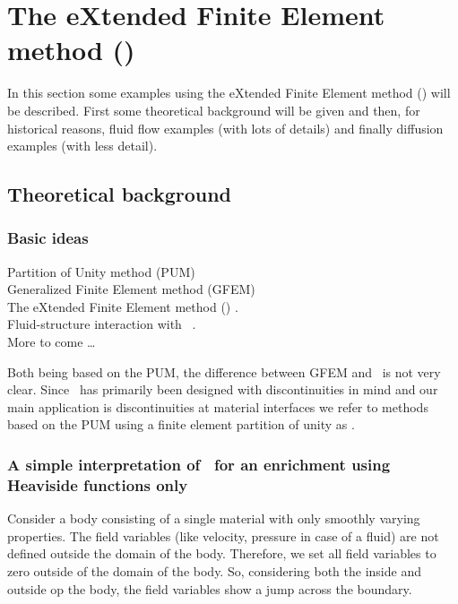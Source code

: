 
\def\headdate{28th January 2014}

\section{The eXtended Finite Element method (\xfem)}
\label{sec:xfem}

In this section some examples using the eXtended Finite Element method (\xfem)
will be described.
First some theoretical background will be given and then,
 for historical reasons, fluid flow examples (with
lots of details) and finally diffusion examples (with less
detail).

\subsection{Theoretical background}
\subsubsection{Basic ideas}
Partition of Unity method (PUM) \cite{Babuska97,Melenk06}\\
Generalized Finite Element method (GFEM)
 \cite{Strouboulis00a,Strouboulis00b,Strouboulis01}\\
The eXtended Finite Element method (\xfem) \cite{Belytschko99,Moes99}.\\
Fluid-structure interaction with \xfem\ \cite{Gerstenberger08}.\\
More to come \ldots

Both being based on the PUM, the difference between GFEM and \xfem\ is not very
clear.
Since \xfem\ has primarily been designed with discontinuities in mind and
our main application is discontinuities at material interfaces
we refer to 
methods based on the PUM using a finite element partition of unity as \xfem.

\subsubsection{A simple interpretation of \xfem\ for an enrichment
using Heaviside functions only}
\label{sec:xfem_interpretation}

Consider a body consisting of a single material with only smoothly varying
properties.
The field variables (like velocity, pressure in
case of a fluid) are not defined outside the domain of the body. Therefore,
we set all field variables to zero outside of the domain of the body. So,
considering both the inside and outside op the body,
the field variables show a jump across the boundary.

